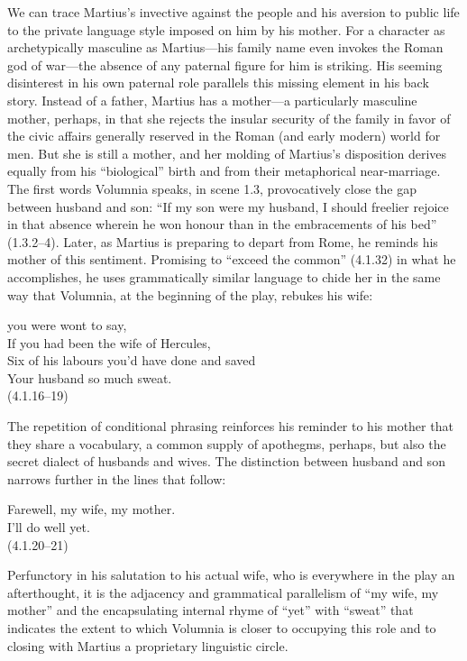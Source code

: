 We can trace Martius's invective against the people and his aversion to public life to the private language style imposed on him by his mother.
For a character as archetypically masculine as Martius---his family name even invokes the Roman god of war---the absence of any paternal figure for him is striking.
His seeming disinterest in his own paternal role parallels this missing element in his back story.
Instead of a father, Martius has a mother---a particularly masculine mother, perhaps, in that she rejects the insular security of the family in favor of the civic affairs generally reserved in the Roman (and early modern) world for men.
But she is still a mother, and her molding of Martius's disposition derives equally from his ``biological'' birth and from their metaphorical near-marriage.
The first words Volumnia speaks, in scene 1.3, provocatively close the gap between husband and son: ``If my son were my husband, I should freelier rejoice in that absence wherein he won honour than in the embracements of his bed'' (1.3.2--4).
Later, as Martius is preparing to depart from Rome, he reminds his mother of this sentiment.
Promising to ``exceed the common'' (4.1.32) in what he accomplishes, he uses grammatically similar language to chide her in the same way that Volumnia, at the beginning of the play, rebukes his wife:
\begin{vq}
you were wont to say,\\
If you had been the wife of Hercules,\\
Six of his labours you'd have done and saved\\
Your husband so much sweat.\\
\hfill(4.1.16--19)
\end{vq}
The repetition of conditional phrasing reinforces his reminder to his mother that they share a vocabulary, a common supply of apothegms, perhaps, but also the secret dialect of husbands and wives.
The distinction between husband and son narrows further in the lines that follow:
\begin{vq}
Farewell, my wife, my mother.\\
I'll do well yet.\\
\hfill(4.1.20--21)
\end{vq}
Perfunctory in his salutation to his actual wife, who is everywhere in the play an afterthought, it is the adjacency and grammatical parallelism of ``my wife, my mother'' and the encapsulating internal rhyme of ``yet'' with ``sweat'' that indicates the extent to which Volumnia is closer to occupying this role and to closing with Martius a proprietary linguistic circle.
